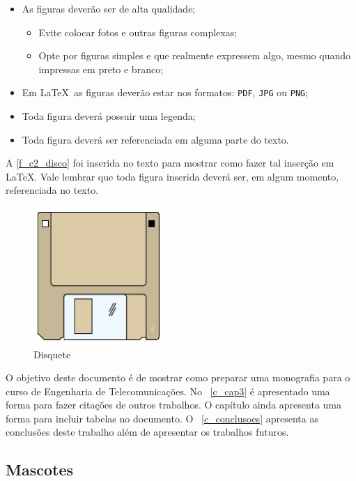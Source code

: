 \begin{itemize}
	\item As figuras deverão ser de alta qualidade;
	\begin{itemize}
		\item Evite colocar fotos e outras figuras complexas;
		\item Opte por figuras simples e que realmente expressem algo, mesmo quando impressas em preto e branco;
	\end{itemize}
	\item Em \LaTeX~as figuras deverão estar nos formatos: \texttt{PDF}, \texttt{JPG} ou \texttt{PNG};
	\item Toda figura deverá possuir uma legenda;
	\item Toda figura deverá ser referenciada em alguma parte do texto.
\end{itemize}

A \autoref{f_c2_disco} foi inserida no texto para mostrar como fazer tal inserção em \LaTeX. Vale lembrar que toda figura inserida deverá ser, em algum momento, referenciada no texto. 

\begin{figure}[!htpb]
	\centering
	\caption{Disquete}\label{f_c2_disco}
    \includegraphics[width=5cm]{03-elementos/03.2_textual/03.2.1_fig/disco.pdf}
\end{figure}

O objetivo deste documento é de mostrar como preparar uma monografia para o curso de Engenharia de Telecomunicações. No ~\autoref{c_cap3} é apresentado uma forma para fazer citações de outros trabalhos. O capítulo ainda apresenta uma forma para incluir tabelas no documento. O ~\autoref{c_conclusoes} apresenta as conclusões deste trabalho além de apresentar os trabalhos futuros.

\subsection{Mascotes}
\label{s_c2_mascotes}

